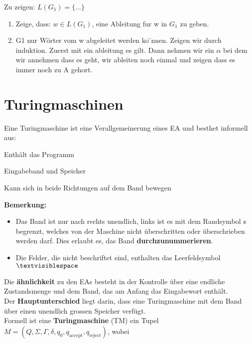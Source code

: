 \documentclass[11pt]{article}
\begin{document}
Zu zeigen: $L(G_1) = \{...\}$
\begin{enumerate}
	\item Zeige, dass: $w \in L(G_1)$, eine Ableitung fur w in $G_1$ zu geben.
	\item G1 nur W{\"o}rter vom w abgeleitet werden ko ̈nnen. Zeigen wir durch induktion. Zuerst mit ein ableitung es gilt. Dann nehmen wir ein $\alpha$ bei dem wir annehmen dass es geht, wir ableiten noch einmal und zeigen dass es immer noch zu A gehort.
\end{enumerate}

\section{Turingmaschinen}

Eine Turingmaschine ist eine Verallgemeinerung eines EA und besthet informell aus:
\begin{description}[labelindent=16pt,style=multiline,leftmargin=4.5cm, noitemsep]
	\item[Kontrolle:] Enth{\"a}lt das Programm
	\item[Unendliches Band:] Eingabeband und Speicher
	\item[Lese-/Schreibkopf:] Kann sich in beide Richtungen auf dem Band bewegen
\end{description}

\textbf{Bemerkung:} \begin{itemize}
	\item Das Band ist nur nach rechts unendlich, links ist es mit dem Randsymbol $\cent$ begrenzt, welches von der Maschine nicht {\"u}berschritten oder {\"u}berschrieben werden darf. Dies erlaubt es, das Band \textbf{durchzunummerieren}.
	\item Die Felder, die nicht beschriftet sind, enthalten das Leerfeldsymbol $\textvisiblespace$
\end{itemize}

Die \textbf{{\"a}hnlichkeit} zu den EAs besteht in der Kontrolle {\"u}ber eine endliche Zustandsmenge und dem Band, das am Anfang das Eingabewort enth{\"a}lt. \\
Der \textbf{Hauptunterschied} liegt darin, dass eine Turingmaschine mit dem Band {\"u}ber einen unendlich grossen Speicher verf{\"u}gt. \\

Formell ist eine \textbf{Turingmaschine} (TM) ein Tupel $M = (Q, \Sigma, \Gamma, \delta, q_0, q_\text{accept}, q_\text{reject})$, wobei
\end{document}
